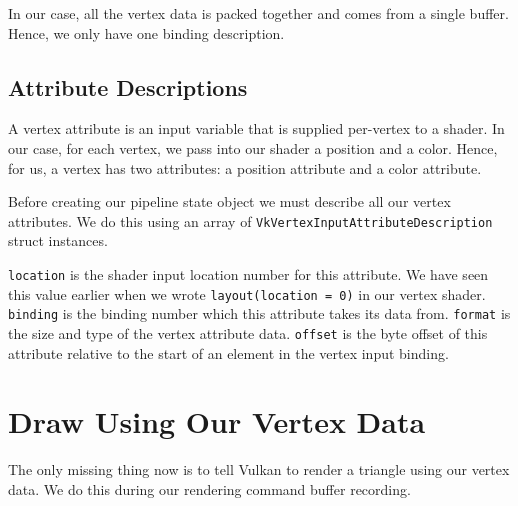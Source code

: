 In our case, all the vertex data is packed together and comes from a single buffer.
Hence, we only have one binding description.

\begin{minipage}{\linewidth}{\noindent}
    
\end{minipage}

\subsection{Attribute Descriptions}

A vertex attribute is an input variable that is supplied per-vertex to a shader.
In our case, for each vertex, we pass into our shader a position and a color.
Hence, for us, a vertex has two attributes: a position attribute and a
color attribute.

Before creating our pipeline state object we must describe all our
vertex attributes.
We do this using an array of \texttt{VkVertexInputAttributeDescription} struct
instances.

\begin{minipage}{\linewidth}{\noindent}
    
\end{minipage}

\texttt{location} is the shader input location number for this attribute.
We have seen this value earlier when we wrote \texttt{layout(location = 0)}
in our vertex shader.
\texttt{binding} is the binding number which this attribute takes its data from.
\texttt{format} is the size and type of the vertex attribute data.
\texttt{offset} is the byte offset of this attribute relative to the start of
an element in the vertex input binding.

\section{Draw Using Our Vertex Data}

The only missing thing now is to tell Vulkan to render a triangle using our
vertex data.
We do this during our rendering command buffer recording.

\begin{minipage}{\linewidth}{\noindent}
    
\end{minipage}
